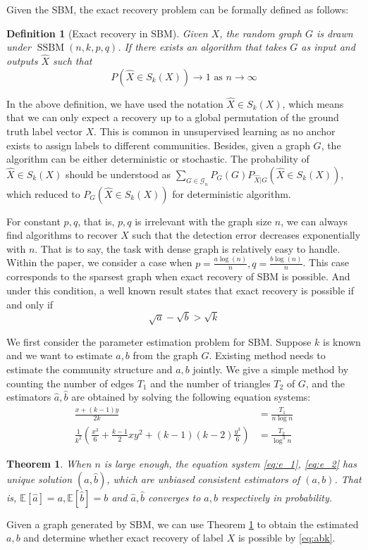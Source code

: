 \documentclass[journal]{IEEEtran}
\newtheorem{theorem}{Theorem}
\newtheorem{definition}{Definition}
\newcommand{\A}{\frac{a \log(n)}{n}}
\newcommand{\B}{\frac{b \log(n)}{n}}
\newcommand{\cG}{\mathcal{G}}
\newcommand{\1}{\mathbbm{1}}
\DeclareMathOperator{\SSBM}{SSBM}
\begin{document}
Given the SBM, the exact recovery problem can be formally defined as follows:
\begin{definition}[Exact recovery in SBM] \label{def:SSBMR}
Given $X$, the random graph $G$ is drawn under $\SSBM(n,k,p,q)$. If there exists an algorithm that takes
$G$ as input and outputs $\hat{X}$ such that
\begin{equation*}
P(\hat{X} \in S_k(X)) \to 1 \textrm{ as } n \to \infty
\end{equation*}
\end{definition}

In the above definition, we have used the notation $\hat{X} \in S_k(X)$, which means that we can only
expect a recovery up to a global permutation of the ground truth label vector $X$. This is common in unsupervised
learning as no anchor exists to assign labels to different communities. Besides, given a graph $G$, the algorithm can
be either deterministic or stochastic. The probability of $\hat{X} \in S_k(X)$ should be understood as 
$\sum_{G \in \cG_n} P_G(G) P_{\hat{X}|G}(\hat{X} \in S_k(X))$, which reduced to 
$P_G(\hat{X} \in S_k(X))$ for deterministic algorithm.

For constant $p,q$, that is, $p,q$ is irrelevant with the graph size $n$,
we can always find algorithms to recover $X$ such that the detection error decreases exponentially with $n$.
That is to say, the task with dense graph is relatively easy to handle. Within the paper, we consider a case
when $p = \A, q = \B$. This case corresponds to the sparsest graph when exact recovery of SBM is possible.
And under this condition, a well known result \cite{abbe2015community} states that
exact recovery is possible if and only if
\begin{equation}\label{eq:abk}
\sqrt{a} - \sqrt{b} > \sqrt{k}
\end{equation}

We first consider the parameter estimation problem for SBM. Suppose $k$ is known and we want to estimate $a,b$ from the graph $G$.
Existing method needs to estimate the community structure and $a,b$ jointly. We give a simple method
by counting the number of edges $T_1$ and the number of triangles $T_2$ of $G$, and the estimators $\hat{a}, \hat{b}$ are
obtained by solving the following equation systems:
\begin{align}
\frac{x+(k-1)y}{2k} & = \frac{T_1}{n\log n} \label{eq:e_1}\\
\frac{1}{k^2}
\left(\frac{x^3}{6} + \frac{k-1}{2}xy^2 + (k-1)(k-2)\frac{y^3}{6}\right) & = \frac{T_2}{\log^3 n} \label{eq:e_2}
\end{align}
\begin{theorem}\label{thm:ab12}
When $n$ is large enough, the equation system \eqref{eq:e_1}, \eqref{eq:e_2} has unique solution $(\hat{a}, \hat{b})$,
which are unbiased consistent estimators
of $(a,b)$. That is,
$\mathbb{E}[\hat{a}] = a, \mathbb{E}[\hat{b}] = b$ and $\hat{a}, \hat{b}$ converges to $a,b$ respectively in probability.
\end{theorem}
Given a graph generated by SBM, we can use Theorem \ref{thm:ab12} to obtain the estimated $a,b$ and determine whether
exact recovery of label $X$ is possible by \eqref{eq:abk}.
\end{document}
